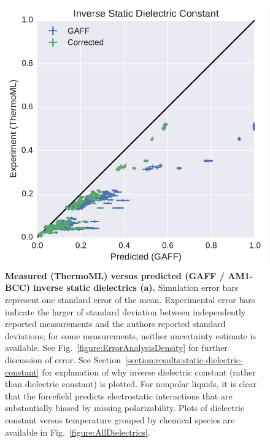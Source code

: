 \documentclass[journal=jacsat,manuscript=article]{achemso}
\begin{document}
\begin{figure}
\includegraphics[width=\columnwidth]{./figures/dielectrics_thermoml.pdf}

\caption{{\bf Measured (ThermoML) versus predicted (GAFF / AM1-BCC) inverse static dielectrics (a).}
Simulation error bars represent one standard error of the mean.  
Experimental error bars indicate the larger of standard deviation between independently reported measurements and the authors reported standard deviations; for some measurements, neither uncertainty estimate is available.  
See Fig.~\ref{figure:ErrorAnalysisDensity} for further discussion of error.  
See Section~\ref{section:results:static-dielectric-constant} for explanation of why inverse dielectric constant (rather than dielectric constant) is plotted. 
For nonpolar liquids, it is clear that the forcefield predicts electrostatic interactions that are substantially biased by missing polarizability.
Plots of dielectric constant versus temperature grouped by chemical species are available in Fig.~\ref{figure:AllDielectrics}.
}
\label{figure:Dielectric}
\end{figure}

\end{document}
